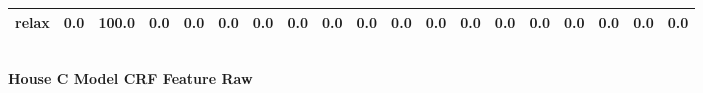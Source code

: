 \documentclass{article}
\begin{document}
\begin{sideways}
\begin{tabular}{lrrrrrrrrrrrrrrrrrr}
relax                         &         0.0 &              100.0 &           0.0 &                          0.0 &                0.0 &                0.0 &                        0.0 &          0.0 &              0.0 &                0.0 &                    0.0 &                      0.0 &                  0.0 &                   0.0 &              0.0 &              0.0 &                                  0.0 &          0.0 \\
\bottomrule
\end{tabular}
\end{sideways}
\normalsize
\vspace{1cm}\\
\textbf{House C Model CRF Feature Raw}\\
\vspace{1cm}\\
\end{document}
